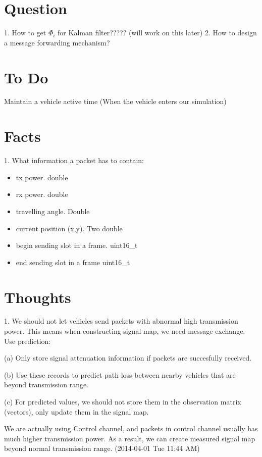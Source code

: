 \documentclass[10pt]{article}
\begin{document}
\section{Question}
1. How to get $\Phi_i$ for Kalman filter????? (will work on this later)
2. How to design a message forwarding mechanism?

\section{To Do}
Maintain a vehicle active time (When the vehicle enters our simulation)


\section {Facts}
1. What information a packet has to contain:
\begin{itemize}
  \item tx power. double
  \item rx power. double
  \item travelling angle. Double
  \item current position (x,y). Two double
  \item begin sending slot in a frame. uint16\_t
  \item end sending slot in a frame  uint16\_t
\end{itemize}

\section {Thoughts}
1. We should not let vehicles send packets with abnormal high transmission power. This means when constructing signal map, we need message exchange.  Use prediction:

(a) Only store signal attenuation information if packets are succesfully received. 

(b) Use these records to predict path loss between nearby vehicles that are beyond transmission range.

(c) For predicted values, we should not store them in the observation matrix (vectors), only update them in the signal map.

We are actually using Control channel, and packets in control channel usually has much higher transmission power. As a result, we can create measured signal map beyond normal transmission range. (2014-04-01 Tue 11:44 AM)
\end{document}
